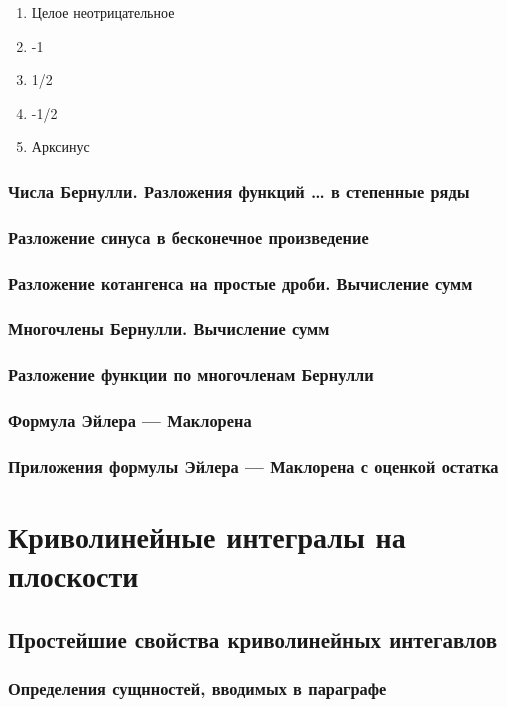 \documentclass[12pt, a4paper, oneside]{memoir}
\begin{document}
\begin{enumerate}
    \item Целое неотрицательное
    \item -1
    \item 1/2
    \item -1/2
    \item Арксинус
\end{enumerate}

\subsection{Числа Бернулли. Разложения функций … в степенные ряды}
\subsection{Разложение синуса в бесконечное произведение}
\subsection{Разложение котангенса на простые дроби. Вычисление сумм}
\subsection{Многочлены Бернулли. Вычисление сумм}
\subsection{Разложение функции по многочленам Бернулли}
\subsection{Формула Эйлера — Маклорена}
\subsection{Приложения формулы Эйлера — Маклорена с оценкой остатка}


\chapter{Криволинейные интегралы на плоскости}

\section{Простейшие свойства криволинейных интегавлов}

\subsection{Определения сущнностей, вводимых в параграфе}
\end{document}
